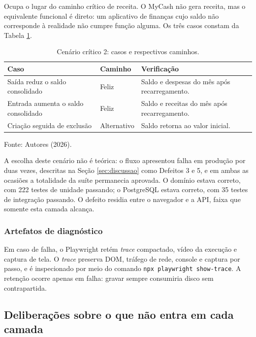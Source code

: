 \documentclass[12pt,a4paper]{article}
\begin{document}
Ocupa o lugar do caminho crítico de receita. O MyCash não gera receita, mas o equivalente funcional é direto: um aplicativo de finanças cujo saldo não corresponde à realidade não cumpre função alguma. Os três casos constam da Tabela \ref{tab:e2e2}.

\begin{table}[H]
\centering
\caption{Cenário crítico 2: casos e respectivos caminhos.}
\label{tab:e2e2}
\renewcommand{\arraystretch}{1.4}
\begin{tabularx}{\textwidth}{@{}>{\RaggedRight}p{5.6cm}>{\centering}p{2.4cm}>{\RaggedRight\arraybackslash}X@{}}
\toprule
\textbf{Caso} & \textbf{Caminho} & \textbf{Verificação} \\
\midrule
Saída reduz o saldo consolidado & Feliz & Saldo e despesas do mês após recarregamento. \\
Entrada aumenta o saldo consolidado & Feliz & Saldo e receitas do mês após recarregamento. \\
Criação seguida de exclusão & Alternativo & Saldo retorna ao valor inicial. \\
\bottomrule
\end{tabularx}
\vspace{0.3cm}

\noindent\footnotesize Fonte: Autores (2026).
\end{table}

A escolha deste cenário não é teórica: o fluxo apresentou falha em produção por duas vezes, descritas na Seção \ref{sec:discussao} como Defeitos 3 e 5, e em ambas as ocasiões a totalidade da suíte permanecia aprovada. O domínio estava correto, com 222 testes de unidade passando; o PostgreSQL estava correto, com 35 testes de integração passando. O defeito residia entre o navegador e a API, faixa que somente esta camada alcança.

\subsubsection{Artefatos de diagnóstico}

Em caso de falha, o Playwright retém \textit{trace} compactado, vídeo da execução e captura de tela. O \textit{trace} preserva DOM, tráfego de rede, console e captura por passo, e é inspecionado por meio do comando \texttt{npx playwright show-trace}. A retenção ocorre apenas em falha: gravar sempre consumiria disco sem contrapartida.

\subsection{Deliberações sobre o que não entra em cada camada}
\end{document}
